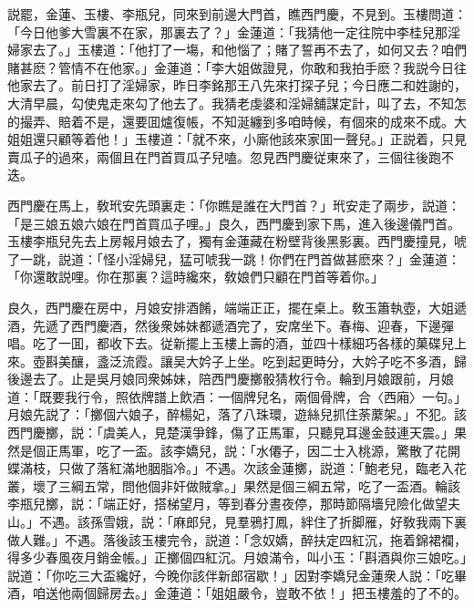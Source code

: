 説罷，金蓮、玉樓、李瓶兒，同來到前邊大門首，瞧西門慶，不見到。玉樓問道：「今日他爹大雪裏不在家，那裏去了？」金蓮道：「我猜他一定往院中李桂兒那淫婦家去了。」玉樓道：「他打了一塲，和他惱了；賭了誓再不去了，如何又去？咱們賭甚麽？管情不在他家。」金蓮道：「李大姐做證見，你敢和我拍手麽？我説今日往他家去了。前日打了淫婦家，昨日李銘那王八先來打探子兒；今日應二和姓謝的，大清早晨，勾使鬼走來勾了他去了。我猜老虔婆和淫婦舖謀定計，叫了去，不知怎的撮弄、賠着不是，還要囬爐復帳，不知涎纏到多咱時候，有個來的成來不成。大姐姐還只顧等着他！」玉樓道：「就不來，小廝他該來家囬一聲兒。」正説着，只見賣瓜子的過來，兩個且在門首買瓜子兒嗑。忽見西門慶従東來了，三個往後跑不迭。

西門慶在馬上，敎玳安先頭裏走：「你瞧是誰在大門首？」玳安走了兩步，説道：「是三娘五娘六娘在門首買瓜子哩。」良久，西門慶到家下馬，進入後邊儀門首。玉樓李瓶兒先去上房報月娘去了，獨有金蓮藏在粉壁背後黑影裏。西門慶撞見，唬了一跳，説道：「怪小淫婦兒，猛可唬我一跳！你們在門首做甚麽來？」金蓮道：「你還敢説哩。你在那裏？這時纔來，敎娘們只顧在門首等着你。」

良久，西門慶在房中，月娘安排酒餚，端端正正，擺在桌上。敎玉簫執壺，大姐遞酒，先遞了西門慶酒，然後衆姊妹都遞酒完了，安席坐下。春梅、迎春，下邊彈唱。吃了一囬，都收下去。従新擺上玉樓上壽的酒，並四十樣細巧各樣的菓碟兒上來。壺斟美釀，盞泛流霞。讓吴大妗子上坐。吃到起更時分，大妗子吃不多酒，歸後邊去了。止是吳月娘同衆姊妹，陪西門慶擲骰猜枚行令。輪到月娘跟前，月娘道：「既要我行令，照依牌譜上飲酒：一個牌兒名，兩個骨牌，合〈西廂〉一句。」月娘先説了：「擲個六娘子，醉楊妃，落了八珠環，遊絲兒抓住荼䕷架。」不犯。該西門慶擲，説：「虞美人，見楚漢爭鋒，傷了正馬軍，只聽見耳邊金鼓連天震。」果然是個正馬軍，吃了一盃。該李嬌兒，説：「水僊子，因二士入桃源，驚散了花開蝶滿枝，只做了落紅滿地胭脂冷。」不遇。次該金蓮擲，説道：「鮑老兒，臨老入花叢，壞了三綱五常，問他個非奸做賊拿。」果然是個三綱五常，吃了一盃酒。輪該李瓶兒擲，説：「端正好，搭梯望月，等到春分晝夜停，那時節隔墻兒險化做望夫山。」不遇。該孫雪娥，説：「麻郎兒，見羣鴉打鳳，絆住了折脚雁，好敎我兩下裏做人難。」不遇。落後該玉樓完令，説道：「念奴嬌，醉扶定四紅沉，拖着錦裙襴，得多少春風夜月銷金帳。」正擲個四紅沉。月娘滿令，叫小玉：「斟酒與你三娘吃。」説道：「你吃三大盃纔好，今晚你該伴新郎宿歇！」因對李嬌兒金蓮衆人説：「吃畢酒，咱送他兩個歸房去。」金蓮道：「姐姐嚴令，豈敢不依！」把玉樓羞的了不的。

